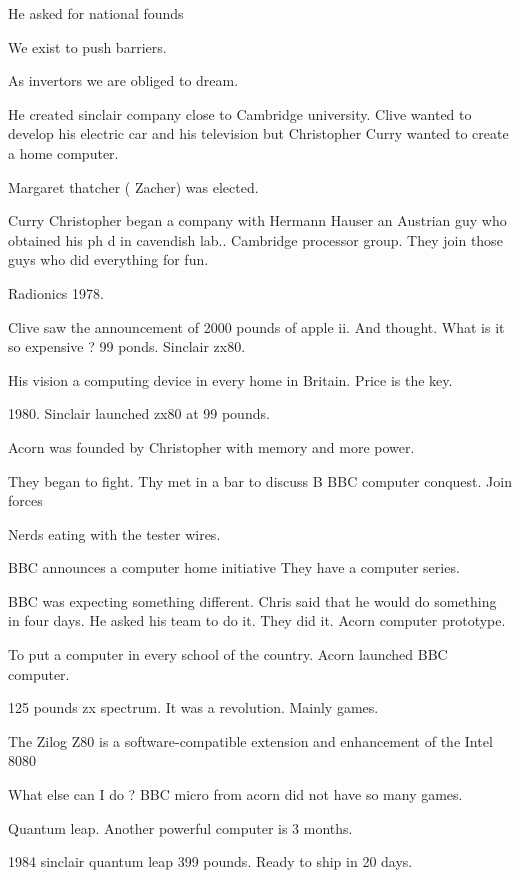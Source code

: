    He asked for national founds
   
   We exist to push barriers. 
   
   As invertors we are obliged to dream. 
   
   He created sinclair company close to Cambridge university. 
   Clive wanted to develop his electric car and his television but Christopher Curry wanted to create a home computer. 
   
   Margaret thatcher ( Zacher) was elected. 
   
   Curry Christopher began a company with Hermann Hauser an Austrian guy who obtained his ph d in cavendish lab..  Cambridge processor group. 
   They join those guys who did everything for fun. 
   
   Radionics 1978. 
   
   Clive saw the announcement of 2000 pounds of apple ii. And thought. What is it so expensive ? 
   99 ponds. Sinclair zx80. 
   
   His vision a computing device in every home in Britain. Price is the key. 
   
   1980. Sinclair launched zx80 at 99 pounds. 
   
   Acorn was founded by Christopher with memory and more power. 
   
   They began to fight. Thy met in a bar to discuss B BBC computer conquest. Join forces 
   
   Nerds eating with the tester wires.
   
   
   BBC announces a computer home initiative 
   They have a computer series. 
   
   BBC was expecting something different. Chris said that he would do something in four days. 
   He asked his team to do it. They did it. Acorn computer prototype. 
   
   To put a computer in every school of the country. 
   Acorn launched BBC computer. 
   
   125 pounds zx spectrum. 
   It was a revolution. 
   Mainly games. 
   
   The Zilog Z80 is a software-compatible extension and enhancement of the Intel 8080 
   
   What else can I do ? 
   BBC micro from acorn did not have so many games. 
   
   Quantum leap. Another powerful computer is 3 months. 
   
   1984 sinclair quantum leap 399 pounds. Ready to ship in 20 days. 
   
